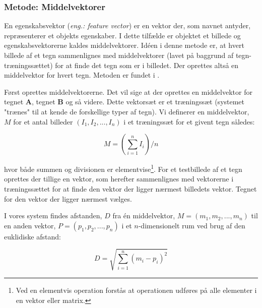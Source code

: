 
\subsubsection*{Metode: Middelvektorer}
En egenskabsvektor (\textit{eng.: feature vector}) er en vektor der, som navnet antyder, repræsenterer et objekts egenskaber. I dette tilfælde er objektet et billede og egenskabsvektorerne kaldes middelvektorer. Idéen i denne metode er, at hvert billede af et tegn sammenlignes med middelvektorer (lavet på baggrund af tegn-træningssættet) for at finde det tegn som er i billedet. Der oprettes altså en middelvektor for hvert tegn. Metoden er fundet i \cite{arth}.

Først oprettes middelvektorerne. Det vil sige at der oprettes en middelvektor for tegnet \textbf{A}, tegnet \textbf{B} og så videre. Dette vektorsæt er et træningssæt (systemet "trænes" til at kende de forskellige typer af tegn). Vi definerer en middelvektor, $M$ for et antal billeder $(I_{1},I_{2},...,I_{n})$ i et træningssæt for et givent tegn således:

\begin{displaymath}
	M = (\sum_{i=1}^{n}I_i)/n
\end{displaymath}


hvor både summen og divisionen er elementvise\footnote{Ved en elementvis operation forstås at operationen udføres på alle elementer i en vektor eller matrix.}. For et testbillede af et tegn oprettes der tillige en vektor, som herefter sammenlignes med vektorerne i træningssættet for at finde den vektor der ligger nærmest billedets vektor. Tegnet for den vektor der ligger nærmest vælges.

I vores system findes afstanden, $D$ fra én middelvektor, $M = (m_{1},m_{2},...,m_{n})$ til en anden vektor, $P = (p_{1},p_{2},...,p_{n})$ i et $n$-dimensionelt rum ved brug af den euklidiske afstand\cite{wiki_euclid}:

\begin{displaymath}
	D = \sqrt{\sum_{i=1}^{n}(m_{i}-p_{i})^{2}}
\end{displaymath}

